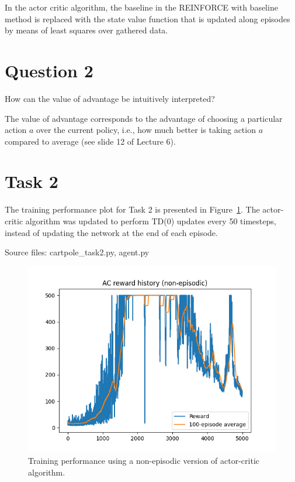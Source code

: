 \documentclass[12pt]{article}
\begin{document}
In the actor critic algorithm, the baseline in the REINFORCE with baseline method is replaced with the state value function that is updated along episodes by means of least squares over gathered data. 

\section*{Question 2}

How can the value of advantage be intuitively interpreted?
\newline

The value of advantage corresponds to the advantage of choosing a particular action $a$ over the current policy, i.e., how much better is taking action $a$ compared to average (see slide 12 of Lecture 6).


\section*{Task 2}

The training performance plot for Task 2 is presented in Figure~\ref*{fig:fig2}. 
The actor-critic algorithm was updated to perform TD(0) updates every 50 timesteps,
instead of updating the network at the end of each episode. 
\newline

\noindent
Source files: cartpole\_task2.py, agent.py

\begin{figure}[pht] 
	\centering  %
    \includegraphics[width=0.8\columnwidth]{img/Figure_2_task_2_cumulative_reward.png}
	\caption{Training performance using a non-episodic version of actor-critic algorithm.}
	\label{fig:fig2}
\end{figure}
\end{document}
